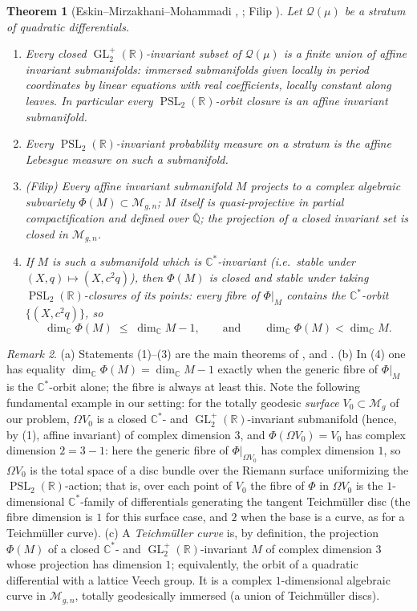 \documentclass[11pt]{article}
\newcommand{\C}{\mathbb{C}}
\newcommand{\R}{\mathbb{R}}
\newcommand{\cQ}{\mathcal{Q}}
\newcommand{\M}{\mathcal{M}}
\DeclareMathOperator{\PSL}{PSL}
\DeclareMathOperator{\GL}{GL}
\newtheorem{thm}{Theorem}[section]
\theoremstyle{definition}
\theoremstyle{remark}
\newtheorem{rmk}[thm]{Remark}
\begin{document}
\begin{thm}[Eskin--Mirzakhani--Mohammadi \cite{EM}, \cite{EMM}; Filip
\cite{Filip}]\label{thm:EMM}
Let $\cQ(\mu)$ be a stratum of quadratic differentials.
\begin{enumerate}[label=(\arabic*)]
\item Every closed $\GL_2^+(\R)$-invariant subset of $\cQ(\mu)$ is a finite
union of \emph{affine invariant submanifolds}: immersed submanifolds given
locally in period coordinates by linear equations with real coefficients,
locally constant along leaves. In particular every $\PSL_2(\R)$-orbit
closure is an affine invariant submanifold.
\item Every $\PSL_2(\R)$-invariant probability measure on a stratum is the
affine Lebesgue measure on such a submanifold.
\item \emph{(Filip)} Every affine invariant submanifold $M$ projects to a
complex algebraic subvariety $\Phi(M) \subset \M_{g,n}$; $M$ itself is
quasi-projective in partial compactification and defined over
$\bar{\mathbb{Q}}$; the projection of a closed invariant set is closed in
$\M_{g,n}$.
\item If $M$ is such a submanifold which is $\C^*$-invariant (i.e.\ stable
under $(X,q) \mapsto (X, c^2q)$), then $\Phi(M)$ is closed and stable
under taking $\PSL_2(\R)$-closures of its points: every fibre of
$\Phi|_M$ contains the $\C^*$-orbit $\{(X,c^2q)\}$, so
\[
\dim_{\C} \Phi(M) \;\le\; \dim_{\C} M - 1,
\qquad\text{and}\qquad
\dim_{\C}\Phi(M) < \dim_{\C} M .
\]
\end{enumerate}
\end{thm}

\begin{rmk}\label{rmk:correctdims}
(a) Statements (1)--(3) are the main theorems of \cite{EM}, \cite{EMM}
and \cite{Filip}. (b) In (4) one has equality
$\dim_{\C} \Phi(M) = \dim_{\C} M - 1$ exactly when the generic fibre of
$\Phi|_M$ is the $\C^*$-orbit alone; the fibre is always at least this.
Note the following fundamental example in our setting: for the totally
geodesic \emph{surface} $V_0 \subset \M_g$ of our problem,
$\Omega V_0$ is a closed $\C^*$- and $\GL_2^+(\R)$-invariant submanifold
(hence, by (1), affine invariant) of complex dimension $3$, and
$\Phi(\Omega V_0) = V_0$ has complex dimension $2 = 3 - 1$: here the
generic fibre of $\Phi|_{\Omega V_0}$ has complex dimension $1$, so
$\Omega V_0$ is the total space of a disc bundle over the Riemann
surface uniformizing the $\PSL_2(\R)$-action; that is, over each point
of $V_0$ the fibre of $\Phi$ in $\Omega V_0$ is the $1$-dimensional
$\C^*$-family of differentials generating the tangent Teichm\"uller
disc (the fibre dimension is $1$ for this surface case, and $2$ when
the base is a curve, as for a Teichm\"uller curve).
(c) A \emph{Teichm\"uller curve} is, by definition, the projection
$\Phi(M)$ of a closed $\C^*$- and $\GL_2^+(\R)$-invariant $M$ of complex
dimension $3$ whose projection has dimension $1$; equivalently, the orbit
of a quadratic differential with a lattice Veech group. It is a complex
$1$-dimensional algebraic curve in $\M_{g,n}$, totally geodesically
immersed (a union of Teichm\"uller discs).
\end{rmk}
\end{document}
